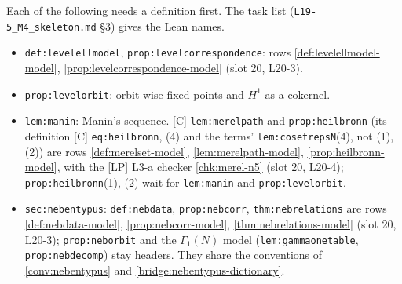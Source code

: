 \begin{remark}\label{rmk:m4-g9-headers}
  Each of the following needs a definition first. The task list (\texttt{L19-5\_M4\_skeleton.md} §3) gives the Lean names.
  \begin{itemize}
    \item [C] \texttt{def:levelellmodel}, \texttt{prop:levelcorrespondence}: rows \ref{def:levelellmodel-model},
      \ref{prop:levelcorrespondence-model} (slot 20, L20-3).
    \item [C] \texttt{prop:levelorbit}: orbit-wise fixed points and $H^1$ as a cokernel.
    \item [C] \texttt{lem:manin}: Manin's sequence. [C] \texttt{lem:merelpath} and \texttt{prop:heilbronn} (its definition
      [C] \texttt{eq:heilbronn}, (4) and the terms' \texttt{lem:cosetrepsN}(4), not (1), (2)) are rows \ref{def:merelset-model},
      \ref{lem:merelpath-model}, \ref{prop:heilbronn-model}, with the [LP] L3-a checker \ref{chk:merel-n5} (slot 20, L20-4);
      \texttt{prop:heilbronn}(1), (2) wait for \texttt{lem:manin} and \texttt{prop:levelorbit}.
    \item [C] \texttt{sec:nebentypus}: \texttt{def:nebdata}, \texttt{prop:nebcorr}, \texttt{thm:nebrelations} are rows
      \ref{def:nebdata-model}, \ref{prop:nebcorr-model}, \ref{thm:nebrelations-model} (slot 20, L20-3); \texttt{prop:neborbit}
      and the $\Gamma_1(N)$ model (\texttt{lem:gammaonetable}, \texttt{prop:nebdecomp}) stay headers. They share the conventions of
      \ref{conv:nebentypus} and \ref{bridge:nebentypus-dictionary}.
  \end{itemize}
\end{remark}
